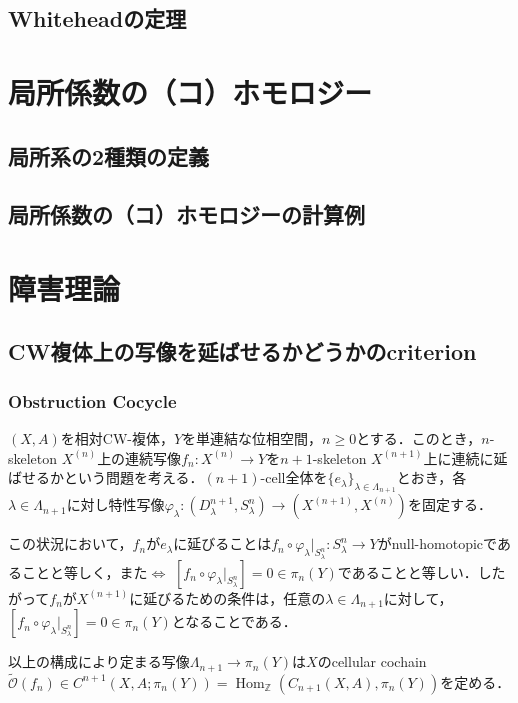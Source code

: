 \documentclass[a4paper,11pt]{jsarticle}
\theoremstyle{definition}
\DeclareMathOperator{\Hom}{\mathrm{Hom}}
\begin{document}
\subsection{Whiteheadの定理}
\section{局所係数の（コ）ホモロジー}
\subsection{局所系の2種類の定義}
\subsection{局所係数の（コ）ホモロジーの計算例}
\section{障害理論}
\subsection{CW複体上の写像を延ばせるかどうかのcriterion}
\subsubsection{Obstruction Cocycle}
$(X,A)$を相対CW-複体，$Y$を単連結な位相空間，$n\ge 0$とする．このとき，$n$-skeleton $X^{(n)}$上の連続写像$f_n\colon X^{(n)}\to Y$を$n+1$-skeleton $X^{(n+1)}$上に連続に延ばせるかという問題を考える．$(n+1)$-cell全体を$\{e_{\lambda}\}_{\lambda\in \Lambda_{n+1}}$とおき，各$\lambda\in\Lambda_{n+1}$に対し特性写像$\varphi_\lambda\colon (D^{n+1}_\lambda,S^n_\lambda)\to (X^{(n+1)},X^{(n)})$を固定する．

この状況において，$f_n$が$e_\lambda$に延びることは$f_n\circ\varphi_\lambda|_{S^n_\lambda}\colon S^n_\lambda\to Y$がnull-homotopicであることと等しく，また$\Leftrightarrow$ $[f_n\circ \varphi_\lambda|_{S^n_\lambda}]=0\in \pi_n(Y)$であることと等しい．したがって$f_n$が$X^{(n+1)}$に延びるための条件は，任意の$\lambda\in\Lambda_{n+1}$に対して，$[f_n\circ \varphi_\lambda|_{S^n_\lambda}]=0\in \pi_n(Y)$となることである．

以上の構成により定まる写像$\Lambda_{n+1}\to \pi_n(Y)$は$X$のcellular cochain $\tilde{\mathcal{O}}(f_n)\in C^{n+1}(X,A;\pi_n(Y))=\Hom_\mathbb{Z}(C_{n+1}(X,A),\pi_n(Y))$を定める．
\end{document}

